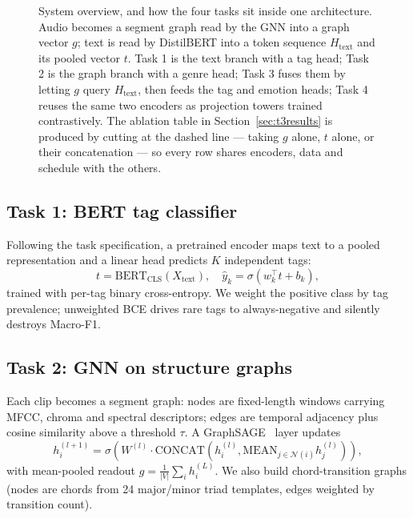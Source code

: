 \documentclass[conference]{IEEEtran}
\begin{document}
\begin{figure}[t]
{%
}
\caption{System overview, and how the four tasks sit inside one architecture.
Audio becomes a segment graph read by the GNN into a graph vector $g$; text is
read by DistilBERT into a token sequence $H_{\text{text}}$ and its pooled vector
$t$. Task 1 is the text branch with a tag head; Task 2 is the graph branch with
a genre head; Task 3 fuses them by letting $g$ query $H_{\text{text}}$, then
feeds the tag and emotion heads; Task 4 reuses the same two encoders as
projection towers trained contrastively. The ablation table in
Section~\ref{sec:t3results} is produced by cutting at the dashed line --- taking
$g$ alone, $t$ alone, or their concatenation --- so every row shares encoders,
data and schedule with the others.}
\label{fig:arch}
\end{figure}

\subsection{Task 1: BERT tag classifier}
Following the task specification, a pretrained encoder maps text to a pooled
representation and a linear head predicts $K$ independent tags:
\begin{equation}
t = \mathrm{BERT}_{\mathrm{CLS}}(X_{\mathrm{text}}), \quad
\hat{y}_k = \sigma(w_k^\top t + b_k),
\end{equation}
trained with per-tag binary cross-entropy. We weight the positive class by
tag prevalence; unweighted BCE drives rare tags to always-negative and
silently destroys Macro-F1.

\subsection{Task 2: GNN on structure graphs}
Each clip becomes a segment graph: nodes are fixed-length windows carrying
MFCC, chroma and spectral descriptors; edges are temporal adjacency plus
cosine similarity above a threshold $\tau$. A GraphSAGE~\cite{sage} layer updates
\begin{equation}
h_i^{(l+1)} = \sigma\!\left(W^{(l)} \cdot \mathrm{CONCAT}\!\left(h_i^{(l)},
\mathrm{MEAN}_{j \in \mathcal{N}(i)} h_j^{(l)}\right)\right),
\end{equation}
with mean-pooled readout $g = \frac{1}{|V|}\sum_i h_i^{(L)}$. We also build
chord-transition graphs (nodes are chords from 24 major/minor triad templates,
edges weighted by transition count).
\end{document}
